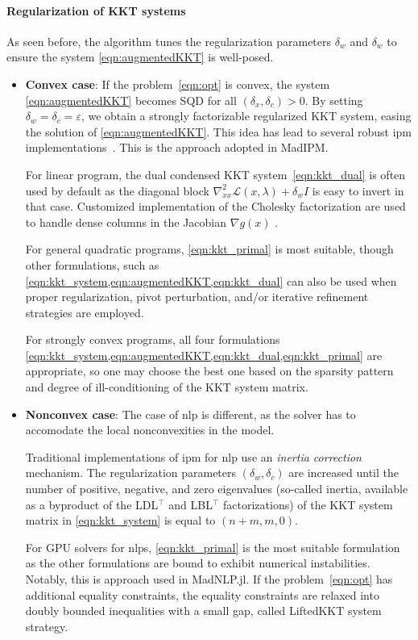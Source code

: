 \documentclass{article}
\begin{document}
\paragraph{Regularization of KKT systems}
As seen before, the algorithm tunes the regularization parameters $\delta_w$
and $\delta_w$ to ensure the system \cref{eqn:augmentedKKT} is well-posed.
\begin{itemize}[leftmargin=*,itemsep=0pt,parsep=0pt,partopsep=0pt]
\item \textbf{Convex case}: If the problem~\cref{eqn:opt} is convex, the system \cref{eqn:augmentedKKT}
becomes SQD for all $(\delta_x, \delta_c) > 0$. By setting
$\delta_w = \delta_c = \varepsilon$, we obtain a strongly factorizable regularized KKT system,
easing the solution of \cref{eqn:augmentedKKT}.
This idea has lead to several robust \gls{ipm} implementations~\cite{}.
This is the approach adopted in MadIPM.

For linear program, the dual condensed KKT system~\cref{eqn:kkt_dual} is often used
by default as the diagonal block $\nabla^2_{x x} \mathcal{L}(x, \lambda) + \delta_w I$ is easy
to invert in that case. Customized implementation of the Cholesky factorization
are used to handle dense columns in the Jacobian $\nabla g(x)$ \cite{}.

For general quadratic programs, \cref{eqn:kkt_primal} is most suitable, though other formulations, such as \cref{eqn:kkt_system,eqn:augmentedKKT,eqn:kkt_dual} can also be used when proper regularization, pivot perturbation, and/or iterative refinement strategies are employed.

For strongly convex programs, all four formulations \cref{eqn:kkt_system,eqn:augmentedKKT,eqn:kkt_dual,eqn:kkt_primal} are appropriate, so one may choose the best one based on the sparsity pattern and degree of ill-conditioning of the KKT system matrix.
\item \textbf{Nonconvex case}: The case of \gls*{nlp} is different, as the solver has to accomodate
the local nonconvexities in the model.

Traditional implementations of \gls{ipm} for \gls*{nlp} use an \emph{inertia correction} mechanism.
The regularization parameters $(\delta_w, \delta_c)$ are increased until the number of positive, negative, and zero eigenvalues (so-called inertia, available as a byproduct of the LDL$^\top$ and LBL$^\top$ factorizations) of the KKT system matrix in \cref{eqn:kkt_system} is equal to $(n+m, m, 0)$.

For GPU solvers for \glspl*{nlp}, \cref{eqn:kkt_primal} is the most suitable formulation as the other formulations are bound to exhibit numerical instabilities.
Notably, this is approach used in MadNLP.jl.
If the problem~\cref{eqn:opt} has additional equality constraints,
the equality constraints are relaxed into doubly bounded inequalities with a small gap, called LiftedKKT system strategy.
\end{itemize}
\end{document}
